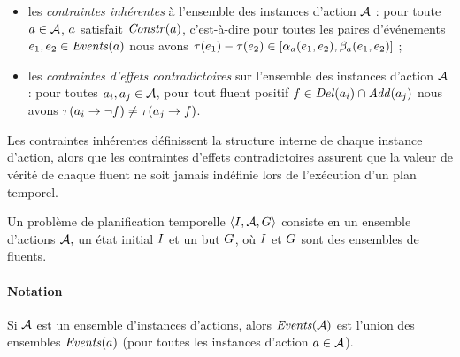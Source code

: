 \begin{itemize}
\item les \emph{contraintes inh\'{e}rentes} \`{a} l'ensemble des instances d'action $\mathcal{A}$ : pour toute $a\in\mathcal{A}$, $a$ satisfait $\mathit{Constr}(a)$, c'est-\`{a}-dire pour toutes les paires d'\'{e}v\'{e}nements $e_1,e_2\in \mathit{Events}(a)$ nous avons $\tau(e_1) - \tau(e_2) \in [\alpha_a(e_1,e_2),\beta_a(e_1,e_2)]$ ;
\item les \emph{contraintes d'effets contradictoires} sur l'ensemble des instances d'action $\mathcal{A}$ : pour toutes $a_i,a_j \in\mathcal{A}$, pour tout fluent positif $f \in \mathit{Del}(a_i) \cap \mathit{Add}(a_j)$ nous avons $\tau(a_i \rightarrow \neg f) \neq \tau(a_j \rightarrow f)$.
\end{itemize}

Les contraintes inh\'{e}rentes d\'{e}finissent la structure interne de chaque instance d'action, alors que les contraintes d'effets contradictoires assurent que la valeur de v\'{e}rit\'{e} de chaque fluent ne soit jamais ind\'{e}finie lors de l'ex\'{e}cution d'un plan temporel. %

\begin{definition}
Un probl\`{e}me de planification temporelle $\langle I, \mathcal{A}, G \rangle$ consiste en un ensemble d'actions $\mathcal{A},$ un \'{e}tat initial $I$ et un but $G$, o\`{u} $I$ et $G$ sont des ensembles de fluents.
\end{definition}
\paragraph*{Notation} Si $\mathcal{A}$ est un ensemble d'instances d'actions, alors $\mathit{Events}(\mathcal{A})$ est l'union des ensembles $\mathit{Events}(a)$ (pour toutes les instances d'action $a\in \mathcal{A}$).


